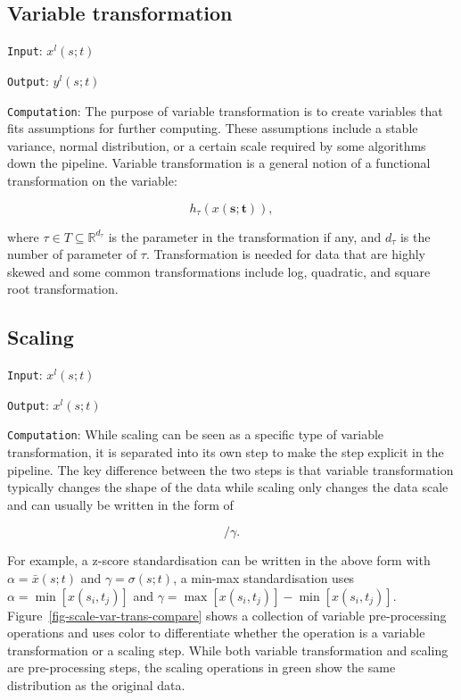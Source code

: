 \documentclass[
]{interact}
\begin{document}
\hypertarget{variable-transformation}{%
\subsection{Variable transformation}\label{variable-transformation}}

\texttt{Input}: \(x^l(s; t)\)

\texttt{Output}: \(y^l(s; t)\)

\texttt{Computation}: The purpose of variable transformation is to
create variables that fits assumptions for further computing. These
assumptions include a stable variance, normal distribution, or a certain
scale required by some algorithms down the pipeline. Variable
transformation is a general notion of a functional transformation on the
variable:

\begin{equation}
h_{\tau}(x(\mathbf{s};\mathbf{t})),
\end{equation}

where \(\tau \in T \subseteq \mathbb{R}^{d_{\tau}}\) is the parameter in
the transformation if any, and \(d_{\tau}\) is the number of parameter
of \(\tau\). Transformation is needed for data that are highly skewed
and some common transformations include log, quadratic, and square root
transformation.

\hypertarget{scaling}{%
\subsection{Scaling}\label{scaling}}

\texttt{Input}: \(x^l(s; t)\)

\texttt{Output}: \(x^l(s; t)\)

\texttt{Computation}: While scaling can be seen as a specific type of
variable transformation, it is separated into its own step to make the
step explicit in the pipeline. The key difference between the two steps
is that variable transformation typically changes the shape of the data
while scaling only changes the data scale and can usually be written in
the form of

\begin{equation}
[x(s_i;t_j) - \alpha]/\gamma.
\end{equation}

For example, a z-score standardisation can be written in the above form
with \(\alpha = \bar{x}(s; t)\) and \(\gamma = \sigma(s; t)\), a min-max
standardisation uses \(\alpha = \min[x(s_i, t_j)]\) and
\(\gamma = \max[x(s_i, t_j)] - \min[x(s_i, t_j)]\).
Figure~\ref{fig-scale-var-trans-compare} shows a collection of variable
pre-processing operations and uses color to differentiate whether the
operation is a variable transformation or a scaling step. While both
variable transformation and scaling are pre-processing steps, the
scaling operations in green show the same distribution as the original
data.
\end{document}
